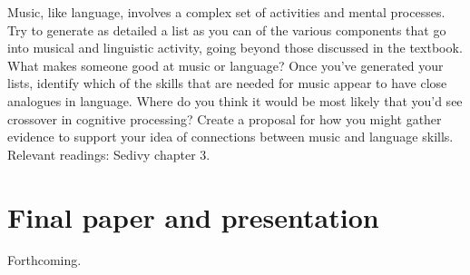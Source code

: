 \documentclass[
  letterpaper,
  DIV=11,
  numbers=noendperiod]{scrreprt}
\begin{document}
Music, like language, involves a complex set of activities and mental
processes. Try to generate as detailed a list as you can of the various
components that go into musical and linguistic activity, going beyond
those discussed in the textbook. What makes someone good at music or
language? Once you've generated your lists, identify which of the skills
that are needed for music appear to have close analogues in language.
Where do you think it would be most likely that you'd see crossover in
cognitive processing? Create a proposal for how you might gather
evidence to support your idea of connections between music and language
skills. Relevant readings: Sedivy chapter 3.

\hypertarget{final-paper-and-presentation}{%
\chapter*{Final paper and
presentation}\label{final-paper-and-presentation}}


Forthcoming.
\end{document}
